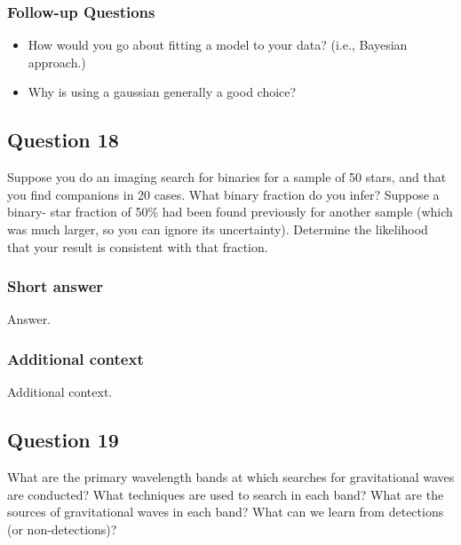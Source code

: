 \documentclass[a4paper,10pt]{article}
\begin{document}
\subsubsection{Follow-up Questions}

\begin{itemize}
    \item How would you go about fitting a model to your data? (i.e., Bayesian approach.)
    \item Why is using a gaussian generally a good choice?
\end{itemize}


\newpage
\subsection{Question 18}

Suppose you do an imaging search for binaries for a sample of 50 stars, and that you find companions in 20 cases. What binary fraction do you infer? Suppose a binary- star fraction of 50\% had been found previously for another sample (which was much larger, so you can ignore its uncertainty). Determine the likelihood that your result is consistent with that fraction.

\subsubsection{Short answer}

Answer.

\subsubsection{Additional context}

Additional context.


\newpage
\subsection{Question 19}

What are the primary wavelength bands at which searches for gravitational waves are conducted? What techniques are used to search in each band? What are the sources of gravitational waves in each band? What can we learn from detections (or non-detections)?
\end{document}
